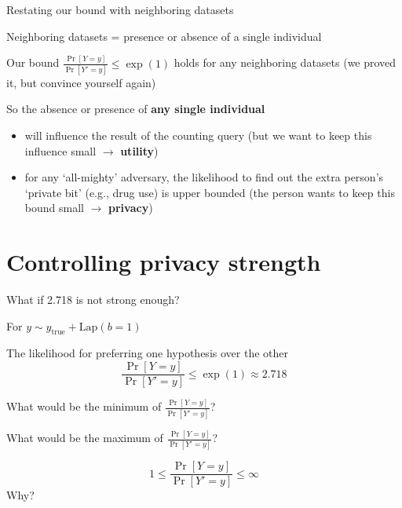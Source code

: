 \documentclass[12pt,aspectratio=169,handout]{beamer}
\begin{document}
\begin{frame}{Restating our bound with neighboring datasets}

Neighboring datasets = presence or absence of a single individual

Our bound $\frac{\Pr[Y = y]}{\Pr[Y' = y]} \leq \exp(1)$ holds for any neighboring datasets (we proved it, but convince yourself again)

So the absence or presence of \textbf{any single individual}
\begin{itemize}
	\item will influence the result of the counting query (but we want to keep this influence small $\rightarrow$ \textbf{utility})
	\item for any `all-mighty' adversary, the likelihood to find out the extra person's `private bit' (e.g., drug use) is upper bounded (the person wants to keep this bound small $\rightarrow$ \textbf{privacy})
\end{itemize}

\end{frame}



\section{Controlling privacy strength}

\begin{frame}{What if 2.718 is not strong enough?}

For $y \sim y_{\mathrm{true}} + \textrm{Lap}(b=1)$

The likelihood for preferring one hypothesis over the other	
$$
\frac{\Pr[Y = y]}{\Pr[Y' = y]} \leq \exp(1) \approx 2.718
$$

What would be the minimum of $\frac{\Pr[Y = y]}{\Pr[Y' = y]}$?

What would be the maximum of $\frac{\Pr[Y = y]}{\Pr[Y' = y]}$?

\pause

$$1 \leq \frac{\Pr[Y = y]}{\Pr[Y' = y]} \leq \infty$$
Why?

	
\end{frame}
\end{document}
